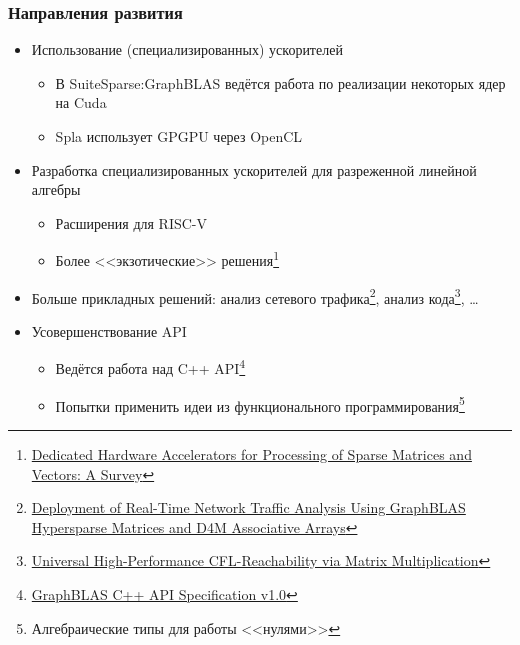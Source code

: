 \documentclass[xcolor=table,aspectratio=169]{beamer}
\begin{document}
\begin{frame}[fragile]
  \frametitle{Направления развития}
  \begin{itemize}
    \item Использование (специализированных) ускорителей
    \begin{itemize}
      \item В SuiteSparse:GraphBLAS ведётся работа по реализации некоторых ядер на Cuda
      \item Spla использует GPGPU через OpenCL 
    \end{itemize}
    \item Разработка специализированных ускорителей для разреженной линейной алгебры
    \begin{itemize}
      \item Расширения для RISC-V
      \item Более <<экзотические>> решения\footnote{\href{https://dl.acm.org/doi/10.1145/3640542}{Dedicated Hardware Accelerators for Processing of Sparse Matrices and Vectors: A Survey}}
    \end{itemize}
    \item Больше прикладных решений:
    анализ сетевого трафика\footnote{\href{https://catalog.caida.org/paper/2023_deployment_of_real_time_network_traffic_analysis_using_graphblas_hyperspace_matrices_and_d4m_associative_arrays}{Deployment of Real-Time Network Traffic Analysis Using GraphBLAS Hypersparse Matrices and D4M Associative Arrays}}, анализ кода\footnote{\href{https://dl.acm.org/doi/10.1145/3735544.3735585}{Universal High-Performance CFL-Reachability via Matrix Multiplication}}, \ldots
    \item Усовершенствование API 
    \begin{itemize}
      \item Ведётся работа над C++ API\footnote{\href{https://graphblas.org/graphblas-api-cpp/}{GraphBLAS C++ API Specification v1.0}} 
      \item Попытки применить идеи из функционального программирования\footnote{Алгебраические типы для работы <<нулями>>} 
    \end{itemize}
  \end{itemize}
\end{frame}

\appendix
\end{document}
